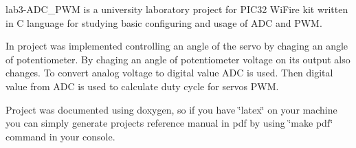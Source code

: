 lab3-\/\+A\+D\+C\+\_\+\+P\+WM is a university laboratory project for P\+I\+C32 Wi\+Fire kit written in C language for studying basic configuring and usage of A\+DC and P\+WM.

In project was implemented controlling an angle of the servo by chaging an angle of potentiometer. By chaging an angle of potentiometer voltage on its output also changes. To convert analog voltage to digital value A\+DC is used. Then digital value from A\+DC is used to calculate duty cycle for servo\textquotesingle{}s P\+WM.

Project was documented using doxygen, so if you have \char`\"{}latex\char`\"{} on your machine you can simply generate project\textquotesingle{}s reference manual in pdf by using \char`\"{}make pdf\char`\"{} command in your console. 